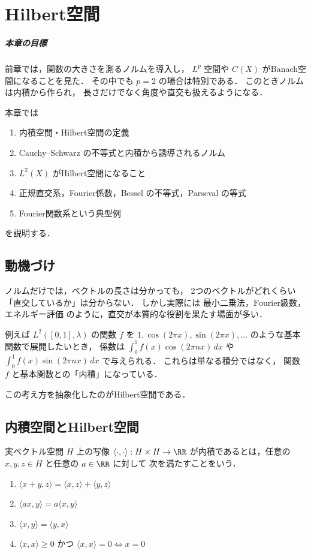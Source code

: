 \setcounter{chapter}{12}
\chapter{Hilbert空間}

\paragraph{本章の目標}
前章では，関数の大きさを測るノルムを導入し，
$L^p$ 空間や $C(X)$ がBanach空間になることを見た．
その中でも
$p=2$ の場合は特別である．
このときノルムは内積から作られ，
長さだけでなく角度や直交も扱えるようになる．

本章では
\begin{enumerate}
    \item 内積空間・Hilbert空間の定義
    \item Cauchy--Schwarz の不等式と内積から誘導されるノルム
    \item $L^2(X)$ がHilbert空間になること
    \item 正規直交系，Fourier係数，Bessel の不等式，Parseval の等式
    \item Fourier関数系という典型例
\end{enumerate}
を説明する．

\section{動機づけ}

ノルムだけでは，ベクトルの長さは分かっても，
2つのベクトルがどれくらい「直交しているか」は分からない．
しかし実際には
$\text{最小二乗法}$，$\text{Fourier級数}$，$\text{エネルギー評価}$
のように，直交が本質的な役割を果たす場面が多い．

例えば $L^2([0,1],\lambda)$ の関数 $f$ を
$1,\cos(2\pi x),\sin(2\pi x),\dots$ のような基本関数で展開したいとき，
係数は
$\int_0^1 f(x)\cos(2\pi nx)\,dx$ や
$\int_0^1 f(x)\sin(2\pi nx)\,dx$ で与えられる．
これらは単なる積分ではなく，
関数 $f$ と基本関数との「内積」になっている．

この考え方を抽象化したのがHilbert空間である．

\section{内積空間とHilbert空間}

\begin{definition}[内積]
実ベクトル空間 $H$ 上の写像 $\langle \cdot,\cdot\rangle:H\times H\to\RR$ が内積であるとは，任意の $x,y,z\in H$ と任意の $a\in\RR$ に対して
次を満たすことをいう．
\begin{enumerate}
    \item $\langle x+y,z\rangle=\langle x,z\rangle+\langle y,z\rangle$
    \item $\langle ax,y\rangle=a\langle x,y\rangle$
    \item $\langle x,y\rangle=\langle y,x\rangle$
    \item $\langle x,x\rangle\ge 0$ かつ $\langle x,x\rangle=0 \iff x=0$
\end{enumerate}
\end{definition}

